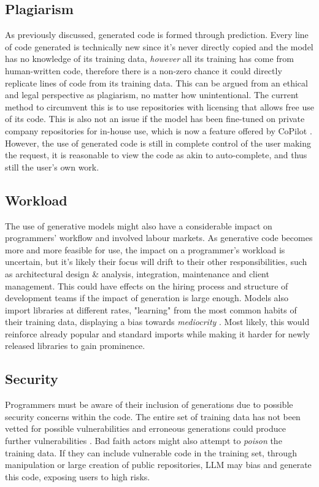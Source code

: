 \documentclass[manuscript,screen,review,sigconf]{acmart}
\begin{document}
\subsection{Plagiarism}
As previously discussed, generated code is formed through prediction. Every line of code generated is technically new since it's never directly copied and the model has no knowledge of its training data, \textit{however} all its training has come from human-written code, therefore there is a non-zero chance it could directly replicate lines of code from its training data. This can be argued from an ethical and legal perspective as plagiarism, no matter how unintentional. The current method to circumvent this is to use repositories with licensing that allows free use of its code. This is also not an issue if the model has been fine-tuned on private company repositories for in-house use, which is now a feature offered by CoPilot \cite{GitHub_2021}. However, the use of generated code is still in complete control of the user making the request, it is reasonable to view the code as akin to auto-complete, and thus still the user's own work.
\subsection{Workload}
The use of generative models might also have a considerable impact on programmers' workflow and involved labour markets. As generative code becomes more and more feasible for use, the impact on a programmer's workload is uncertain, but it's likely their focus will drift to their other responsibilities, such as architectural design \& analysis, integration, maintenance and client management. This could have effects on the hiring process and structure of development teams if the impact of generation is large enough. Models also import libraries at different rates, "learning" from the most common habits of their training data, displaying a bias towards \textit{mediocrity }. Most likely, this would reinforce already popular and standard imports while making it harder for newly released libraries to gain prominence.
\subsection{Security}
Programmers must be aware of their inclusion of generations due to possible security concerns within the code. The entire set of training data has not been vetted for possible vulnerabilities and erroneous generations could produce further vulnerabilities \cite{CodexRelPaper}. Bad faith actors might also attempt to \textit{poison} the training data. If they can include vulnerable code in the training set, through manipulation or large creation of public repositories, LLM may bias and generate this code, exposing users to high risks.
\end{document}
